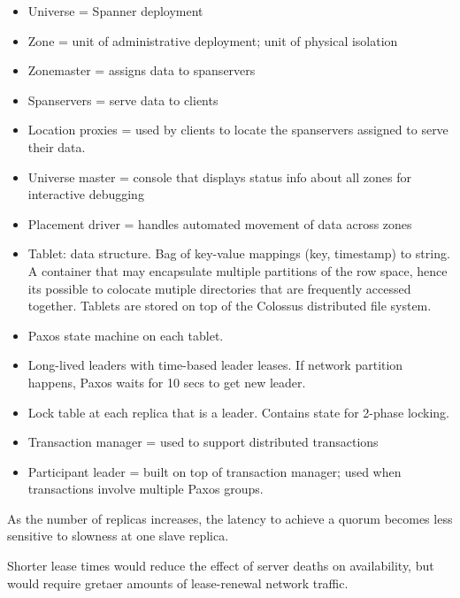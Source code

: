 \begin{itemize}
    \item Universe = Spanner deployment
    \item Zone = unit of administrative deployment; unit of physical isolation
    \item Zonemaster = assigns data to spanservers
    \item Spanservers = serve data to clients
    \item Location proxies = used by clients to locate the spanservers assigned to serve their data.
    \item Universe master = console that displays status info about all zones for interactive debugging
    \item Placement driver = handles automated movement of data across zones
    \item Tablet: data structure. Bag of key-value mappings (key, timestamp) to string. A container that may encapsulate multiple partitions of the row space, hence its possible to colocate mutiple directories that are frequently accessed together. Tablets are stored on top of the Colossus distributed file system. 
    \item Paxos state machine on each tablet.
    \item Long-lived leaders with time-based leader leases. If network partition happens, Paxos waits for 10 secs to get new leader. 
    \item Lock table at each replica that is a leader. Contains state for 2-phase locking.
    \item Transaction manager = used to support distributed transactions
    \item Participant leader = built on top of transaction manager; used when transactions involve multiple Paxos groups.
\end{itemize}

As the number of replicas increases, the latency to achieve a quorum becomes less sensitive to slowness at one slave replica.

Shorter lease times would reduce the effect of server deaths on availability, but would require gretaer amounts of lease-renewal network traffic.
